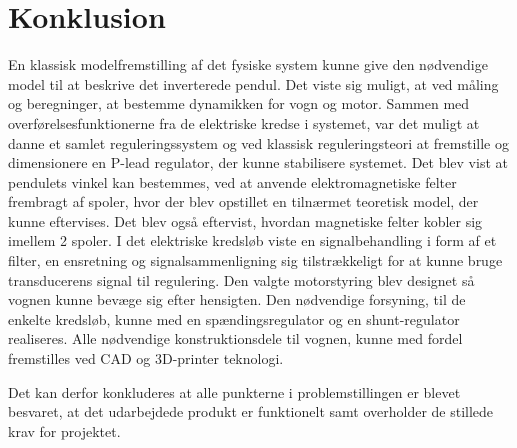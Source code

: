 \chapter{Konklusion} \label{kap:konklusion}
En klassisk modelfremstilling af det fysiske system kunne give den nødvendige model til at beskrive det inverterede pendul.
Det viste sig muligt, at ved måling og beregninger, at bestemme dynamikken for vogn og motor.
Sammen med overførelsesfunktionerne fra de elektriske kredse i systemet, var det muligt at danne et samlet reguleringssystem og ved klassisk reguleringsteori at fremstille og dimensionere en P-lead regulator, der kunne stabilisere systemet.
Det blev vist at pendulets vinkel kan bestemmes, ved at anvende elektromagnetiske felter frembragt af spoler, hvor der blev opstillet en tilnærmet teoretisk model, der kunne eftervises.
Det blev også eftervist, hvordan magnetiske felter kobler sig imellem 2 spoler.
I det elektriske kredsløb viste en signalbehandling i form af et filter, en ensretning og signalsammenligning sig tilstrækkeligt for at kunne bruge transducerens signal til regulering.
Den valgte motorstyring blev designet så vognen kunne bevæge sig efter hensigten.
Den nødvendige forsyning, til de enkelte kredsløb, kunne med en spændingsregulator og en shunt-regulator realiseres.
Alle nødvendige konstruktionsdele til vognen, kunne med fordel fremstilles ved CAD og 3D-printer teknologi.

Det kan derfor konkluderes at alle punkterne i problemstillingen er blevet besvaret, at det udarbejdede produkt er funktionelt samt overholder de stillede krav for projektet. 
